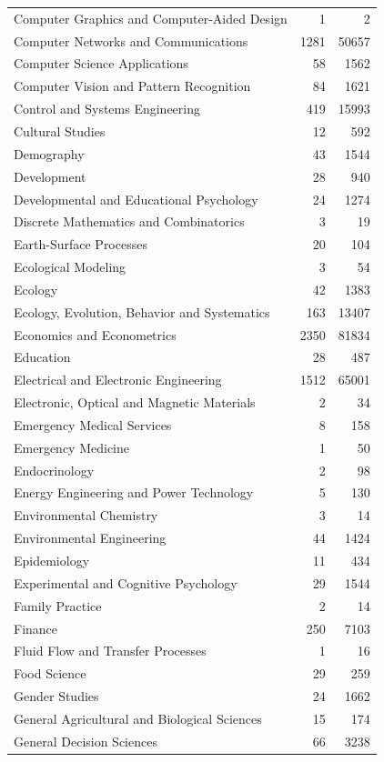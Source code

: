 \documentclass[
  12pt,
]{article}
\begin{document}
\begin{longtable}[t]{|>{}lr>{}r|}
Computer Graphics and Computer-Aided Design & 1 & 2\\
Computer Networks and Communications & 1281 & 50657\\
Computer Science Applications & 58 & 1562\\
Computer Vision and Pattern Recognition & 84 & 1621\\
Control and Systems Engineering & 419 & 15993\\
Cultural Studies & 12 & 592\\
Demography & 43 & 1544\\
Development & 28 & 940\\
Developmental and Educational Psychology & 24 & 1274\\
Discrete Mathematics and Combinatorics & 3 & 19\\
Earth-Surface Processes & 20 & 104\\
Ecological Modeling & 3 & 54\\
Ecology & 42 & 1383\\
Ecology, Evolution, Behavior and Systematics & 163 & 13407\\
Economics and Econometrics & 2350 & 81834\\
Education & 28 & 487\\
Electrical and Electronic Engineering & 1512 & 65001\\
Electronic, Optical and Magnetic Materials & 2 & 34\\
Emergency Medical Services & 8 & 158\\
Emergency Medicine & 1 & 50\\
Endocrinology & 2 & 98\\
Energy Engineering and Power Technology & 5 & 130\\
Environmental Chemistry & 3 & 14\\
Environmental Engineering & 44 & 1424\\
Epidemiology & 11 & 434\\
Experimental and Cognitive Psychology & 29 & 1544\\
Family Practice & 2 & 14\\
Finance & 250 & 7103\\
Fluid Flow and Transfer Processes & 1 & 16\\
Food Science & 29 & 259\\
Gender Studies & 24 & 1662\\
General Agricultural and Biological Sciences & 15 & 174\\
General Decision Sciences & 66 & 3238\\

\end{longtable}
\end{document}
